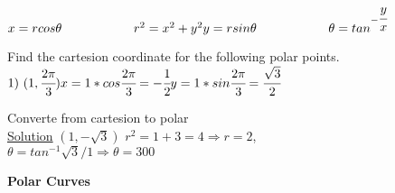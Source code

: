\noindent{\color{smalt(darkpowderblue)}\rule{\linewidth}{.2mm}}
$x=rcos\theta \hspace{2cm} r^2=x^2+y^2\\y=rsin\theta \hspace{2cm} \theta=tan^{-\cfrac{y}{x}}$ \\
\begin{example}
Find the cartesion coordinate for the following polar points.
$1) ~(1, \cfrac{2\pi}{3}) \hspace{2cm} \\x=1*cos\cfrac{2\pi}{3}=-\cfrac{1}{2} \\y=1*sin\cfrac{2\pi}{3}=\cfrac{\sqrt{3}}{2}$\\
\end{example}
\noindent{\color{smalt(darkpowderblue)}\rule{\linewidth}{.2mm}}
\begin{example}
Converte from cartesion to polar \\
\underline{\textbf{\large}\color{smalt(darkpowderblue)}Solution}
$(1,-\sqrt{3}) $
$r^2=1+3 =4 \Rightarrow r=2$,\\ \vspace{.5cm} $\theta=tan^{-1}\sqrt{3}/1 \Rightarrow \theta=300$\\
\end{example}
\noindent{\color{smalt(darkpowderblue)}\rule{\linewidth}{.2mm}}
\large\textbf{{{{Polar Curves}}}} \\
